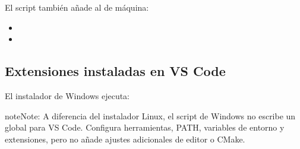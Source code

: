 \documentclass[letterpaper,10pt,english]{sphinxmanual}
\begin{document}
\sphinxAtStartPar
El script también añade al  de máquina:
\begin{itemize}
\item {} 
\sphinxAtStartPar
{}

\item {} 
\sphinxAtStartPar
{}

\end{itemize}


\subsection{Extensiones instaladas en VS Code}
\label{\detokenize{vscode:extensiones-instaladas-en-vs-code}}
\sphinxAtStartPar
El instalador de Windows ejecuta:

\begin{sphinxVerbatim}[commandchars=\\\{\}]
   
   
   
   
\end{sphinxVerbatim}

\begin{sphinxadmonition}{note}{Note:}
\sphinxAtStartPar
A diferencia del instalador Linux, el script de Windows no escribe un
 global para VS Code. Configura herramientas, PATH,
variables de entorno y extensiones, pero no añade ajustes adicionales de
editor o CMake.
\end{sphinxadmonition}
\end{document}
